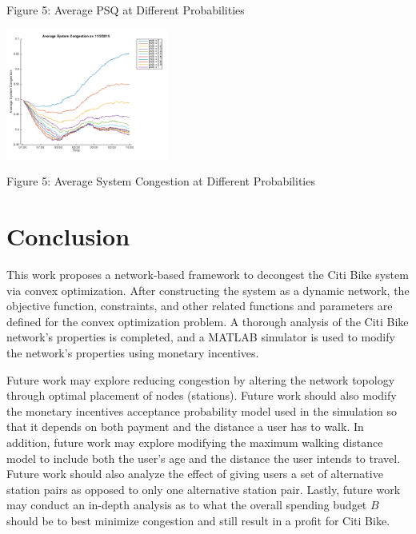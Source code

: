 \documentclass[times, 10pt,twocolumn]{article}
\begin{document}
\centerline{Figure 5: Average PSQ at Different Probabilities}
\hfill \break
\centerline{\includegraphics[width=0.4\textwidth]{m4/System_Congestion_Nov3_Prob.png}}
\centerline{Figure 5: Average System Congestion at Different Probabilities}
\hfill \break




\section{Conclusion}
This work proposes a network-based framework to decongest the Citi Bike system via convex optimization. After constructing the system as a dynamic network, the objective function, constraints, and other related functions and parameters are defined for the convex optimization problem. A thorough analysis of the Citi Bike network's properties is completed, and a MATLAB simulator is used to modify the network's properties using monetary incentives.

Future work may explore reducing congestion by altering the network topology through optimal placement of nodes (stations). Future work should also modify the monetary incentives acceptance probability model used in the simulation so that it depends on both payment and the distance a user has to walk. In addition, future work may explore modifying the maximum walking distance model to include both the user's age and the distance the user intends to travel. Future work should also analyze the effect of giving users a set of alternative station pairs as opposed to only one alternative station pair. Lastly, future work may conduct an in-depth analysis as to what the overall spending budget $B$ should be to best minimize congestion and still result in a profit for Citi Bike.
\end{document}
